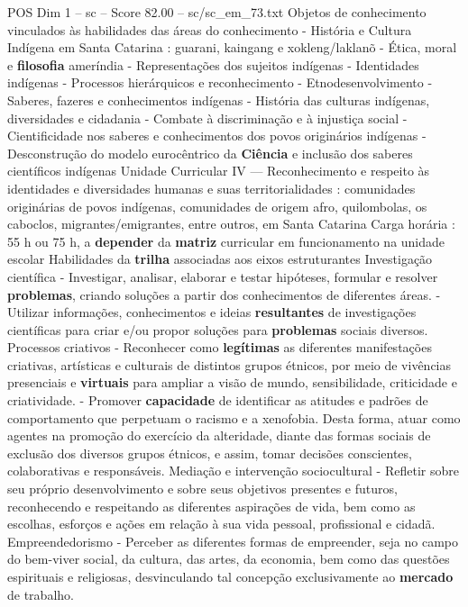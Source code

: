 \begin{textsample}{POS Dim 1 – sc – Score 82.00 – sc/sc\_em\_73.txt}
Objetos de conhecimento vinculados às habilidades das áreas do conhecimento - História e Cultura Indígena em Santa Catarina : guarani, kaingang e xokleng/laklanõ - Ética, moral e \textbf{filosofia} ameríndia - Representações dos sujeitos indígenas - Identidades indígenas - Processos hierárquicos e reconhecimento - Etnodesenvolvimento - Saberes, fazeres e conhecimentos indígenas - História das culturas indígenas, diversidades e cidadania - Combate à discriminação e à injustiça social - Cientificidade nos saberes e conhecimentos dos povos originários indígenas - Desconstrução do modelo eurocêntrico da \textbf{Ciência} e inclusão dos saberes científicos indígenas Unidade Curricular IV — Reconhecimento e respeito às identidades e diversidades humanas e suas territorialidades : comunidades originárias de povos indígenas, comunidades de origem afro, quilombolas, os caboclos, migrantes/emigrantes, entre outros, em Santa Catarina Carga horária : 55 h ou 75 h, a \textbf{depender} da \textbf{matriz} curricular em funcionamento na unidade escolar Habilidades da \textbf{trilha} associadas aos eixos estruturantes Investigação científica - Investigar, analisar, elaborar e testar hipóteses, formular e resolver \textbf{problemas}, criando soluções a partir dos conhecimentos de diferentes áreas. - Utilizar informações, conhecimentos e ideias \textbf{resultantes} de investigações científicas para criar e/ou propor soluções para \textbf{problemas} sociais diversos.
Processos criativos - Reconhecer como \textbf{legítimas} as diferentes manifestações criativas, artísticas e culturais de distintos grupos étnicos, por meio de vivências presenciais e \textbf{virtuais} para ampliar a visão de mundo, sensibilidade, criticidade e criatividade. - Promover \textbf{capacidade} de identificar as atitudes e padrões de comportamento que perpetuam o racismo e a xenofobia.
Desta forma, atuar como agentes na promoção do exercício da alteridade, diante das formas sociais de exclusão dos diversos grupos étnicos, e assim, tomar decisões conscientes, colaborativas e responsáveis.
Mediação e intervenção sociocultural - Refletir sobre seu próprio desenvolvimento e sobre seus objetivos presentes e futuros, reconhecendo e respeitando as diferentes aspirações de vida, bem como as escolhas, esforços e ações em relação à sua vida pessoal, profissional e cidadã.
Empreendedorismo - Perceber as diferentes formas de empreender, seja no campo do bem-viver social, da cultura, das artes, da economia, bem como das questões espirituais e religiosas, desvinculando tal concepção exclusivamente ao \textbf{mercado} de trabalho.

\end{textsample}
